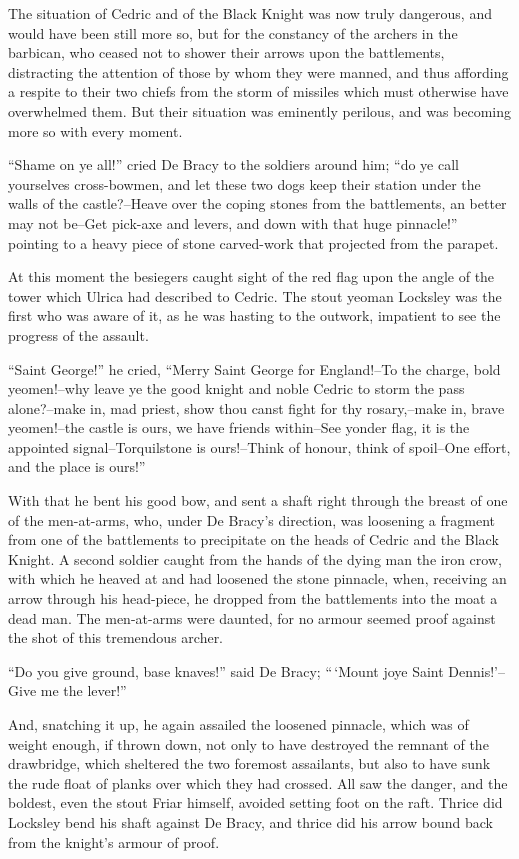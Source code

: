 The situation of Cedric and of the Black Knight was now truly dangerous,
and would have been still more so, but for the constancy of the archers
in the barbican, who ceased not to shower their arrows upon the
battlements, distracting the attention of those by whom they were
manned, and thus affording a respite to their two chiefs from the storm
of missiles which must otherwise have overwhelmed them. But their
situation was eminently perilous, and was becoming more so with every
moment.

``Shame on ye all!'' cried De Bracy to the soldiers around him; ``do ye
call yourselves cross-bowmen, and let these two dogs keep their station
under the walls of the castle?--Heave over the coping stones from the
battlements, an better may not be--Get pick-axe and levers, and down
with that huge pinnacle!'' pointing to a heavy piece of stone
carved-work that projected from the parapet.

At this moment the besiegers caught sight of the red flag upon the angle
of the tower which Ulrica had described to Cedric. The stout yeoman
Locksley was the first who was aware of it, as he was hasting to the
outwork, impatient to see the progress of the assault.

``Saint George!'' he cried, ``Merry Saint George for England!--To the
charge, bold yeomen!--why leave ye the good knight and noble Cedric to
storm the pass alone?--make in, mad priest, show thou canst fight for
thy rosary,--make in, brave yeomen!--the castle is ours, we have friends
within--See yonder flag, it is the appointed signal--Torquilstone is
ours!--Think of honour, think of spoil--One effort, and the place is
ours!''

With that he bent his good bow, and sent a shaft right through the
breast of one of the men-at-arms, who, under De Bracy's direction, was
loosening a fragment from one of the battlements to precipitate on the
heads of Cedric and the Black Knight. A second soldier caught from the
hands of the dying man the iron crow, with which he heaved at and had
loosened the stone pinnacle, when, receiving an arrow through his
head-piece, he dropped from the battlements into the moat a dead man.
The men-at-arms were daunted, for no armour seemed proof against the
shot of this tremendous archer.

``Do you give ground, base knaves!'' said De Bracy; ``\,`Mount joye
Saint Dennis!'--Give me the lever!''

And, snatching it up, he again assailed the loosened pinnacle, which was
of weight enough, if thrown down, not only to have destroyed the remnant
of the drawbridge, which sheltered the two foremost assailants, but also
to have sunk the rude float of planks over which they had crossed. All
saw the danger, and the boldest, even the stout Friar himself, avoided
setting foot on the raft. Thrice did Locksley bend his shaft against De
Bracy, and thrice did his arrow bound back from the knight's armour of
proof.


